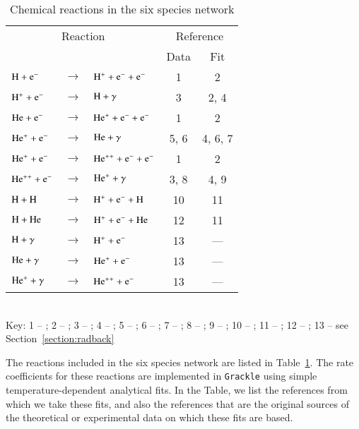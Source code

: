 \begin{table}
\caption{Chemical reactions in the six species network \label{tab:six}}
\begin{tabular}{lclcc}
\hline
\multicolumn{3}{c}{Reaction} & \multicolumn{2}{c}{Reference} \\
& & & Data & Fit \\
\hline
${\rm H + e^{-}}$ & $\rightarrow$ & $\rm{H^{+} + e^{-} + e^{-}}$ & 1 & 2 \\
${\rm H^{+} + e^{-}}$ & $\rightarrow$ & $\rm{H + \gamma} $ & 3 & 2, 4\\
${\rm He + e^{-}}$ & $\rightarrow$ & ${\rm He^{+} + e^{-} + e^{-}}$ & 1 & 2 \\
${\rm He^{+} + e^{-}}$ & $\rightarrow$ & ${\rm He + \gamma}$ & 5, 6 & 4, 6, 7 \\
${\rm He^{+} + e^{-}}$ & $\rightarrow$ & ${\rm He^{++} + e^{-} + e^{-}}$ & 1 & 2 \\
${\rm He^{++} + e^{-}}$ & $\rightarrow$ & ${\rm He^{+} + \gamma}$ & 3, 8 & 4, 9 \\
${\rm H + H}$ & $\rightarrow$ & ${\rm H^{+} + e^{-} + H}$ & 10 & 11 \\
${\rm H + He}$ & $\rightarrow$ & ${\rm H^{+} + e^{-} + He}$ & 12 & 11 \\
${\rm H + \gamma}$ & $\rightarrow$ & ${\rm H^{+} + e^{-}}$ & 13 & --- \\
${\rm He + \gamma}$ & $\rightarrow$ & ${\rm He^{+} + e^{-}}$ & 13 & --- \\
${\rm He^{+} + \gamma}$ & $\rightarrow$ & ${\rm He^{++} + e^{-}}$ & 13 & --- \\
\hline
\end{tabular}
\\ Key: 1 -- \citet{1987ephh.book.....J}; 2 -- \citet{1997NewA....2..181A}; 3 -- \citet{1992ApJ...387...95F}; 4 -- \citet{1997MNRAS.292...27H}; 5 -- \citet{1960MNRAS.121..471B}; 6 -- \citet{1973A&A....25..137A}; 7 -- \citet{1981MNRAS.197..553B}; 8 -- \citet{1978ppim.book.....S}; 9 -- \citet{1992ApJS...78..341C}; 10 -- \citet{1987PhRvA..36.3100G}; 11 -- \citet{1991ApJS...76..759L}; 12 -- \citet{1981JChPh..74..314V}; 13 -- see Section~\ref{section:radback}
\end{table}

The reactions included in the six species network are listed in Table~\ref{tab:six}. The rate coefficients for these reactions are implemented in
\texttt{Grackle} using simple temperature-dependent analytical fits. In the Table, we list the references from which we take these fits, and also the 
references that are the original sources of the theoretical or experimental  data on which these fits are based.

